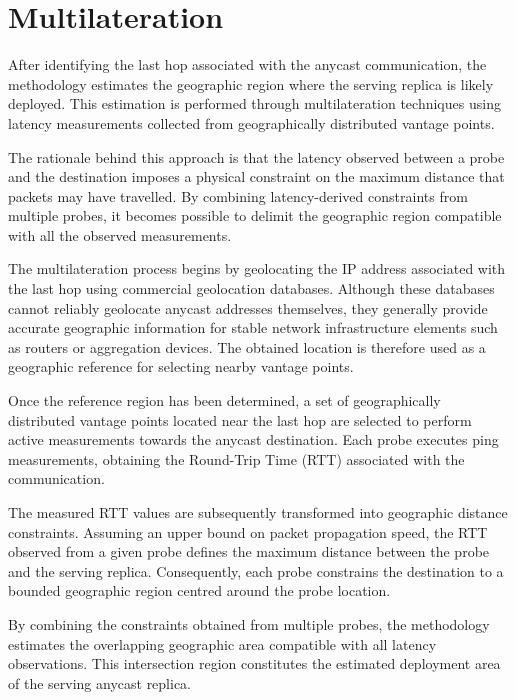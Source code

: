 \section{Multilateration}
\label{sc:hunter_multilateration}

After identifying the last hop associated with the anycast communication, the methodology estimates the geographic region where the serving replica is likely deployed. This estimation is performed through multilateration techniques using latency measurements collected from geographically distributed vantage points.

The rationale behind this approach is that the latency observed between a probe and the destination imposes a physical constraint on the maximum distance that packets may have travelled. By combining latency-derived constraints from multiple probes, it becomes possible to delimit the geographic region compatible with all the observed measurements.

The multilateration process begins by geolocating the IP address associated with the last hop using commercial geolocation databases. Although these databases cannot reliably geolocate anycast addresses themselves, they generally provide accurate geographic information for stable network infrastructure elements such as routers or aggregation devices. The obtained location is therefore used as a geographic reference for selecting nearby vantage points.

Once the reference region has been determined, a set of geographically distributed vantage points  located near the last hop are selected to perform active measurements towards the anycast destination. Each probe executes ping \cite{Ping8Page} measurements, obtaining the Round-Trip Time (RTT) associated with the communication.

The measured RTT values are subsequently transformed into geographic distance constraints. Assuming an upper bound on packet propagation speed, the RTT observed from a given probe defines the maximum distance between the probe and the serving replica. Consequently, each probe constrains the destination to a bounded geographic region centred around the probe location.

By combining the constraints obtained from multiple probes, the methodology estimates the overlapping geographic area compatible with all latency observations. This intersection region constitutes the estimated deployment area of the serving anycast replica.

